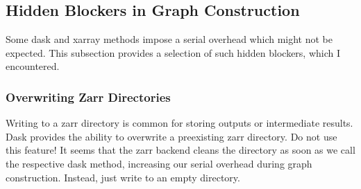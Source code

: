 \subsection{Hidden Blockers in Graph Construction}

Some dask and xarray methods impose a serial overhead which might not be expected.
This subsection provides a selection of such hidden blockers, which I encountered.

\subsubsection{Overwriting Zarr Directories}
Writing to a zarr directory is common for storing outputs or intermediate results.
Dask provides the ability to overwrite a preexisting zarr directory.
Do not use this feature!
It seems that the zarr backend cleans the directory as soon as we call the respective dask method, increasing our serial overhead during graph construction.
Instead, just write to an empty directory.
